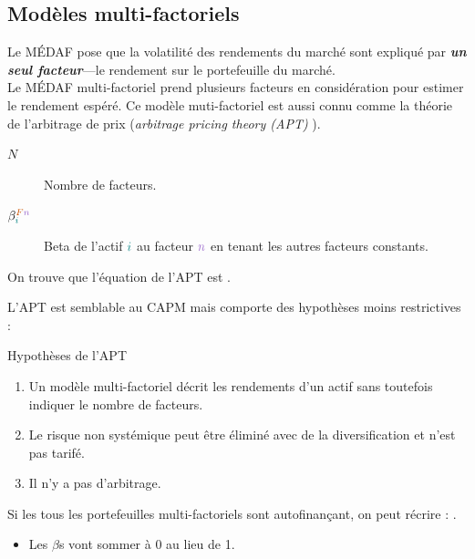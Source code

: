 \documentclass[10pt, french]{article}
\begin{document}
\begin{multicols*}{2}
\columnbreak
\subsection{Modèles multi-factoriels}
\begin{rappel_enhanced}[Contexte]
Le MÉDAF pose que la volatilité des rendements du marché sont expliqué par \textbf{\textit{un seul facteur}}---le rendement sur le portefeuille du marché.\\
Le MÉDAF multi-factoriel prend plusieurs facteurs en considération pour estimer le rendement espéré. Ce modèle muti-factoriel est aussi connu comme la théorie de l'arbitrage de prix (\og \textit{arbitrage pricing theory (APT)} \fg{}).
\end{rappel_enhanced}
\begin{distributions}[Notation]
\begin{description}
	\item[$N$]	Nombre de facteurs.
	\item[$\beta_{{\color{teal}i}}^{{\color{burntorange}F}{\color{amethyst}n}}$]	Beta de l'actif ${\color{teal}i}$ au {\color{burntorange}facteur} ${\color{amethyst}n}$ en tenant les autres facteurs constants.
\end{description}
\end{distributions}
On trouve que l'équation de l'APT est .

L'APT est semblable au CAPM mais comporte des hypothèses moins restrictives :
\begin{conceptgen}{Hypothèses de l'APT}
\begin{enumerate}
	\item	Un modèle multi-factoriel décrit les rendements d'un actif sans toutefois indiquer le nombre de facteurs.
	\item	Le risque non systémique peut être éliminé avec de la diversification et n'est pas tarifé.
	\item	Il n'y a pas d'arbitrage.
\end{enumerate}
\end{conceptgen}

\begin{definitionNOHFILLprop}
Si les tous les portefeuilles multi-factoriels sont autofinançant, on peut récrire : .
\begin{itemize}
	\item	Les $\beta$s vont sommer à 0 au lieu de 1.
\end{itemize}
\end{definitionNOHFILLprop}



\end{multicols*}
\end{document}
